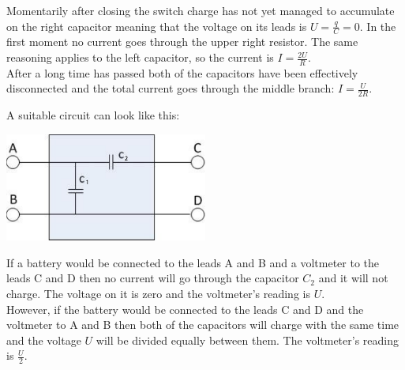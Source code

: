 \documentclass[11pt]{article}
\begin{document}

\solueng
Momentarily after closing the switch charge has not yet managed to accumulate on the right capacitor meaning that the voltage on its leads is $U=\frac{q}{C}=0$. In the first moment no current goes through the upper right resistor. The same reasoning applies to the left capacitor, so the current is $I=\frac{2U}{R}$.\\
After a long time has passed both of the capacitors have been effectively disconnected and the total current goes through the middle branch: $I=\frac{U}{2R}$.
\probend
\bigskip


\solueng
A suitable circuit can look like this:
\begin{center}
\includegraphics[width=0.5\textwidth]{2013-v3g-04-mustkastlah}\\
\end{center}
If a battery would be connected to the leads A and B and a voltmeter to the leads C and D then no current will go through the capacitor $C_2$ and it will not charge. The voltage on it is zero and the voltmeter’s reading is $U$.\\
However, if the battery would be connected to the leads C and D and the voltmeter to A and B then both of the capacitors will charge with the same time and the voltage $U$ will be divided equally between them. The voltmeter’s reading is $\frac{U}{2}$.
\probend
\bigskip

\end{document}
